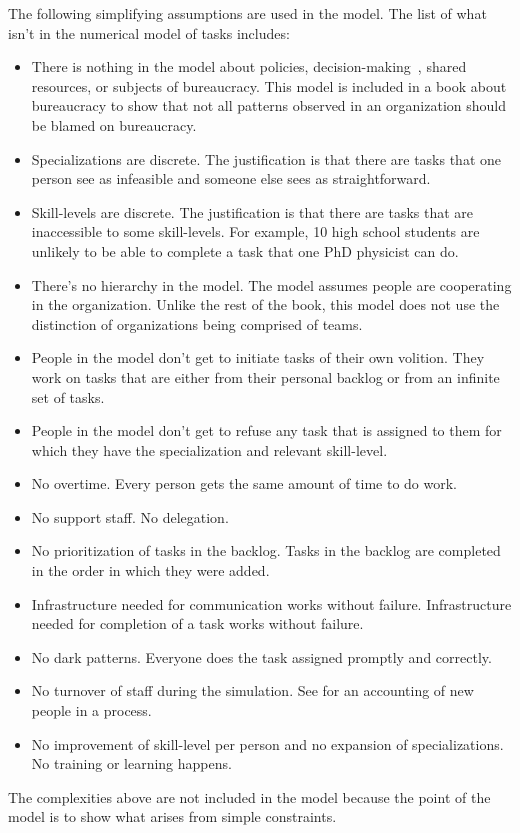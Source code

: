 The following simplifying assumptions are used in the model. The list of what isn't in the numerical model of tasks includes:
\begin{itemize}
    \item There is nothing in the model about policies, decision-making~\cite{2009_Klimek}, shared resources, or subjects of bureaucracy. This model is included in a book about bureaucracy to show that not all patterns observed in an organization should be blamed on bureaucracy. 
    \item Specializations are discrete. The justification is that there are tasks that one person see as infeasible and someone else sees as straightforward.
    \item Skill-levels are discrete. The justification is that there are tasks that are inaccessible to some skill-levels. For example, 10 high school students are unlikely to be able to complete a task that one PhD physicist can do. 
    \item There's no hierarchy in the model. The model assumes people are cooperating in the organization. Unlike the rest of the book, this model does not use the distinction of organizations being comprised of teams.
    \item People in the model don't get to initiate tasks of their own volition. They work on tasks that are either from their personal backlog or from an infinite set of tasks.
    \item People in the model don't get to refuse any task that is assigned to them for which they have the specialization and relevant skill-level.
    \item No overtime. Every person gets the same amount of time to do work.
    \item No support staff. No delegation. 
    \item No prioritization of tasks in the backlog. Tasks in the backlog are completed in the order in which they were added. 
    \item Infrastructure needed for communication works without failure. Infrastructure needed for completion of a task works without failure. 
    \item No dark patterns. Everyone does the task assigned promptly and correctly.
    \item No turnover of staff during the simulation. See \iftoggle{haspagenumbers}{page~\pageref{sec:new-person}}{section~\ref{sec:new-person}} for an accounting of new people in a process.
    \item No improvement of skill-level per person and no expansion of specializations. No training or learning happens. %
\end{itemize}
The complexities above are not included in the model because the point of the model is to show what arises from simple constraints. 


